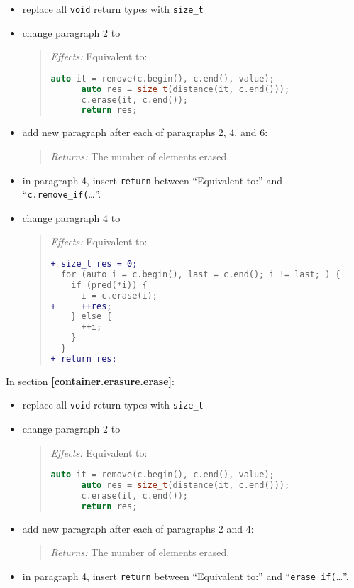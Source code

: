 \documentclass[11pt]{article}
\begin{document}
\begin{itemize}
\item replace all \texttt{void} return types with \texttt{size\_t}
\item change paragraph 2 to
  \begin{quotation}
    \textit{Effects:} Equivalent to:
    \begin{lstlisting}[language=C++]
      auto it = remove(c.begin(), c.end(), value);
      auto res = size_t(distance(it, c.end()));
      c.erase(it, c.end());
      return res;
    \end{lstlisting}
  \end{quotation}
\item add new paragraph after each of paragraphs 2, 4, and 6:
  \begin{quotation}
    \textit{Returns:} The number of elements erased.
  \end{quotation}
\item in paragraph 4, insert \texttt{return} between ``Equivalent
  to:'' and ``\texttt{c.remove\_if(}\ldots''.
\item change paragraph 4 to
  \begin{quotation}
    \textit{Effects:} Equivalent to:
    \begin{lstlisting}[language=diff]
+ size_t res = 0;
  for (auto i = c.begin(), last = c.end(); i != last; ) {
    if (pred(*i)) {
      i = c.erase(i);
+     ++res;
    } else {
      ++i;
    }
  }
+ return res;
    \end{lstlisting}
  \end{quotation}
\end{itemize}

In section \textbf{[container.erasure.erase]}:

\begin{itemize}
\item replace all \texttt{void} return types with \texttt{size\_t}
\item change paragraph 2 to
  \begin{quotation}
    \textit{Effects:} Equivalent to:
    \begin{lstlisting}[language=C++]
      auto it = remove(c.begin(), c.end(), value);
      auto res = size_t(distance(it, c.end()));
      c.erase(it, c.end());
      return res;
    \end{lstlisting}
  \end{quotation}
\item add new paragraph after each of paragraphs 2 and 4:
  \begin{quotation}
    \textit{Returns:} The number of elements erased.
  \end{quotation}
\item in paragraph 4, insert \texttt{return} between ``Equivalent to:'' and ``\texttt{erase\_if(}\ldots''.
\end{itemize}
\end{document}
